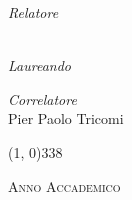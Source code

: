 \begin{titlepage}
\begin{center}
\begin{large}
\begin{flushleft}
\textit{Relatore}\\ 
\vspace{5pt} 
\profTitle \myProf\\
\end{flushleft}
\vspace{0pt} 
\begin{flushright}
\textit{Laureando}\\ 
\vspace{5pt} 
\myName
\end{flushright}
\end{large}
\begin{flushleft}
\textit{Correlatore}\\ 
\vspace{5pt} 
Pier Paolo Tricomi\\
\end{flushleft}
\vspace{12pt}

\line(1, 0){338} \\
\begin{normalsize}
\textsc{Anno Accademico \myAA}
\end{normalsize}

\end{center}
\end{titlepage} 